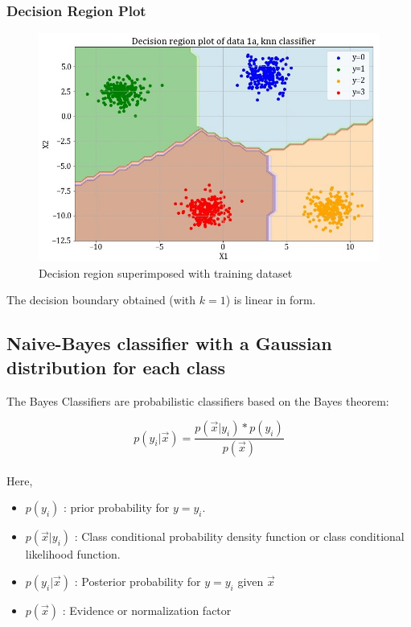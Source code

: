 \documentclass[11pt,a4paper]{article}
\newcommand{\noi}{\noindent}
\begin{document}
\subsubsection{Decision Region Plot}
\begin{figure}[H]
    \centering
    \includegraphics[scale=0.5]{images/1a_knn_decision_region.jpg}
    \caption{Decision region superimposed with training dataset}
    \label{fig:1A_decreg_KNN}
\end{figure}

The decision boundary obtained (with $k=1$) is linear in form. 

\break
\subsection{Naive-Bayes classifier with a Gaussian distribution for each class}
The Bayes Classifiers are probabilistic classifiers based on the Bayes theorem:

\begin{equation}
\label{eqn nb}
    p(y_{i}|\vec{x})=\frac{p(\vec{x}|y_{i})*p(y_{i})}{p(\vec{x})}
\end{equation}\\

\noi
Here,
\begin{itemize}
    \itemsep0em
    \item $p(y_{i})$ : prior probability for $y=y_{i}$.
    \item $p(\vec{x}|y_{i})$ : Class conditional probability density function or class conditional likelihood function.
    \item $p(y_{i}|\vec{x})$ : Posterior probability for $y=y_{i}$ given $\vec{x}$
    \item $p(\vec{x})$ : Evidence or normalization factor
\end{itemize}
\end{document}
